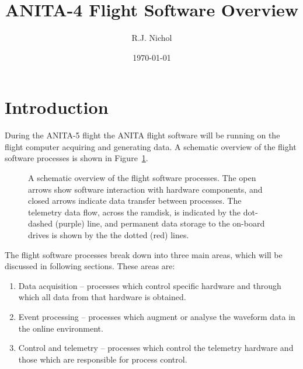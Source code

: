 \documentclass{article}
\begin{document}
\title{ANITA-4 Flight Software Overview}
\author{R.J. Nichol}
  
\date{\today}
\maketitle


\section{Introduction}
During the ANITA-5 flight the ANITA flight software will be running on the flight computer acquiring and generating data. A schematic overview of the flight software processes is shown in Figure~\ref{f:overview}.

  \begin{figure}[hbt]
    \centering
    \caption{A schematic overview of the flight software processes. The open arrows show software interaction with hardware components, and closed arrows indicate data transfer between processes. The telemetry data flow, across the ramdisk, is indicated by the dot-dashed (purple) line, and permanent data storage to the on-board drives is shown by the the dotted (red) lines.}
    \label{f:overview}    
  \end{figure}

The flight software processes break down into three main areas, which will be discussed in following sections. These areas are:
\begin{enumerate}
\item Data acquisition -- processes which control specific hardware and through which all data from that hardware is obtained.
\item Event processing -- processes which augment or analyse the waveform data in the online environment.
\item Control and telemetry -- processes which control the telemetry hardware and those which are responsible for process control.  
\end{enumerate}
\end{document}
